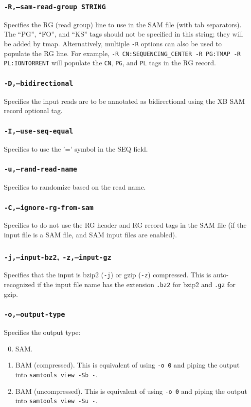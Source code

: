 \documentclass[a4paper,12pt]{book}
\newcommand{\TT}[1]{{\tt #1}} %
\begin{document}
\subsubsection{\TT{-R,--sam-read-group STRING}}
Specifies the RG (read group) line to use in the SAM file (with tab separators).
The ``PG'', ``FO'', and ``KS'' tags should not be specified in this string; they will be added by tmap.
Alternatively, multiple \TT{-R} options can also be used to populate the RG line. 
For example, \TT{-R CN:SEQUENCING\_CENTER -R PG:TMAP -R PL:IONTORRENT} will populate the \TT{CN}, \TT{PG}, and \TT{PL} tags in the RG record.

\subsubsection{\TT{-D,--bidirectional}}
Specifies the input reads are to be annotated as bidirectional using the XB SAM record optional tag.

\subsubsection{\TT{-I,--use-seq-equal}}
Specifies to use the '=' symbol in the SEQ field.

\subsubsection{\TT{-u,--rand-read-name}}
Specifies to randomize based on the read name.

\subsubsection{\TT{-C,--ignore-rg-from-sam}}
Specifies to do not use the RG header and RG record tags in the SAM file (if the input file is a SAM file, and SAM input files are enabled).

\subsubsection{\TT{-j,--input-bz2}, \TT{-z,--input-gz}}
Specifies that the input is bzip2 (\TT{-j}) or gzip (\TT{-z}) compressed.
This is auto-recognized if the input file name has the extension \TT{.bz2} for bzip2 and \TT{.gz} for gzip.

\subsubsection{\TT{-o,--output-type}}
Specifies the output type:
\begin{enumerate}
	\setcounter{enumi}{-1} %
	\item SAM.
	\item BAM (compressed). This is equivalent of using \TT{-o 0} and piping the output into \TT{samtools view -Sb -}.
	\item BAM (uncompressed). This is equivalent of using \TT{-o 0} and piping the output into \TT{samtools view -Su -}.
\end{enumerate}
\end{document}
